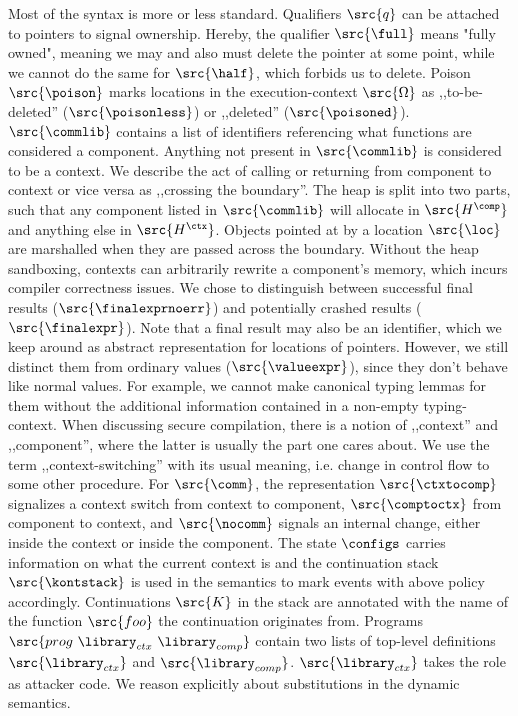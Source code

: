\documentclass[a4paper,names,dvipsnames]{article}
\begin{document}
Most of the syntax is more or less standard.
Qualifiers $\src{q}$ can be attached to pointers to signal ownership.
Hereby, the qualifier $\src{\full}$ means "fully owned", meaning we may and also must delete the pointer at some point, while we cannot do the same for $\src{\half}$, which forbids us to delete.
Poison $\src{\poison}$ marks locations in the execution-context $\src{\Omega}$ as ,,to-be-deleted'' ($\src{\poisonless}$) or ,,deleted'' ($\src{\poisoned}$).
$\src{\commlib}$ contains a list of identifiers referencing what functions are considered a component.
Anything not present in $\src{\commlib}$ is considered to be a context.
We describe the act of calling or returning from component to context or vice versa as ,,crossing the boundary''.
The heap is split into two parts, such that any component listed in $\src{\commlib}$ will allocate in $\src{H^{\comp}}$ and anything else in $\src{H^{\ctx}}$.
Objects pointed at by a location $\src{\loc}$ are marshalled when they are passed across the boundary.
Without the heap sandboxing, contexts can arbitrarily rewrite a component's memory, which incurs compiler correctness issues.
We chose to distinguish between successful final results ($\src{\finalexprnoerr}$) and potentially crashed results ($\src{\finalexpr}$).
Note that a final result may also be an identifier, which we keep around as abstract representation for locations of pointers.
However, we still distinct them from ordinary values ($\src{\valueexpr}$), since they don't behave like normal values.
For example, we cannot make canonical typing lemmas for them without the additional information contained in a non-empty typing-context.
When discussing secure compilation, there is a notion of ,,context'' and ,,component'', where the latter is usually the part one cares about.
We use the term ,,context-switching'' with its usual meaning, i.e. change in control flow to some other procedure.
For $\src{\comm}$, the representation $\src{\ctxtocomp}$ signalizes a context switch from context to component, $\src{\comptoctx}$ from component to context, and $\src{\nocomm}$ signals an internal change, either inside the context or inside the component.
The state $\configs$ carries information on what the current context is and the continuation stack $\src{\kontstack}$ is used in the semantics to mark events with above policy accordingly.
Continuations $\src{K}$ in the stack are annotated with the name of the function $\src{foo}$ the continuation originates from.
Programs $\src{prog\ \library_{ctx}\ \library_{comp}}$ contain two lists of top-level definitions $\src{\library_{ctx}}$ and $\src{\library_{comp}}$.
$\src{\library_{ctx}}$ takes the role as attacker code.
We reason explicitly about substitutions in the dynamic semantics.
\end{document}
